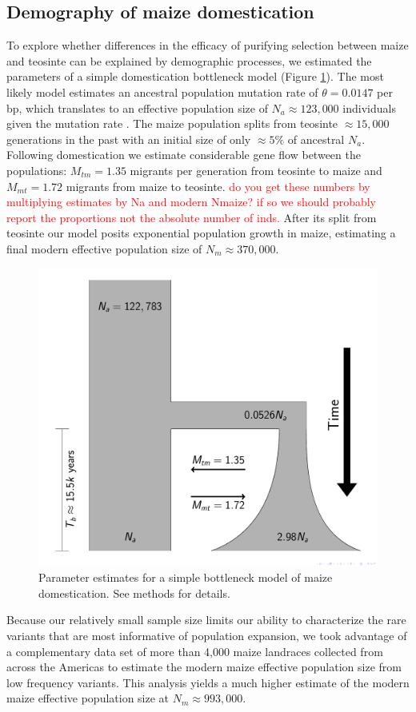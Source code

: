 \documentclass{pnastwo}
\newcommand{\jri}[1]{\textcolor{red}{\scriptsize #1}}
\begin{document}
\begin{article}
\subsection{Demography of maize domestication}
To explore whether differences in the efficacy of purifying selection between maize and teosinte can be explained by demographic processes, we estimated the parameters of a simple domestication bottleneck model  (Figure \ref{fig:bottleneck}). 
The most likely model estimates an ancestral population mutation rate of $\theta=0.0147$ per bp, which translates to an effective population size of $N_a \approx 123,000$ individuals given the mutation rate \cite{clark2005}.
The maize population splits from teosinte $\approx 15,000$ generations in the past with an initial size of only $\approx 5\% $ of ancestral $N_a$. 
Following domestication we estimate considerable gene flow between the populations: $M_{tm} = 1.35$  migrants per generation from teosinte to maize and $M_{mt} = 1.72$ migrants from maize to teosinte. \jri{do you get these numbers by multiplying estimates by Na and modern Nmaize? if so we should probably report the proportions not the absolute number of inds.}
After its split from teosinte our model posits exponential population growth in maize, estimating a final modern effective population size of $N_m \approx 370,000$.

\begin{figure}
\centering
\includegraphics[width=.4\textwidth]{FigsAndFiles/DomesticationModel/domesticationModel.pdf}
\caption{Parameter estimates for a simple bottleneck model of maize domestication. See methods for details. \label{fig:bottleneck} }
\end{figure}

Because our relatively small sample size limits our ability to characterize the rare variants that are most informative of population expansion, we took advantage of a complementary data set of more than 4,000 maize landraces collected from across the Americas \cite{Hearne2015} to estimate the modern maize effective population size from low frequency variants. 
This analysis yields a much higher estimate of the modern maize effective population size at  $N_m \approx 993,000$.


\end{article}
\end{document}

